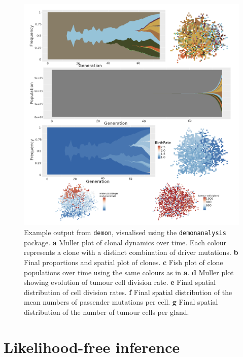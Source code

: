 \begin{figure}[h]
    \centering
    \includegraphics[width=\textwidth]{Chapter_1/figures/demonanalysis_example.png}
    \caption{Example output from \texttt{demon}, visualised using the \texttt{demonanalysis} package.
    \textbf{a} Muller plot of clonal dynamics over time. Each colour represents a clone with a distinct
    combination of driver mutations.
    \textbf{b} Final proportions and spatial plot of clones.
    \textbf{c} Fish plot of clone populations over time using the same colours as in \textbf{a}.
    \textbf{d} Muller plot showing evolution of tumour cell division rate.
    \textbf{e} Final spatial distribution of cell division rates.
    \textbf{f} Final spatial distribution of the mean numbers of passender mutations per cell.
    \textbf{g} Final spatial distribution of the number of tumour cells per gland.}
    \label{fig:demonanalysis_example}
\end{figure}
\clearpage

\section{Likelihood-free inference}
